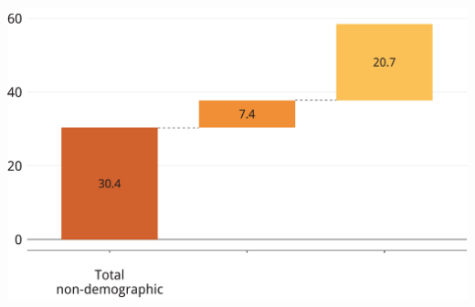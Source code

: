 \documentclass[tikz]{standalone}\usepackage[]{graphicx}\usepackage[]{color}
\newenvironment{knitrout}{}{} %
\begin{document}
\begin{knitrout}
\includegraphics[width=11.000in,height=7.00in]{./b5-figure/FISCAL-Figure13-pre-2} 

\end{knitrout}
\end{document}

